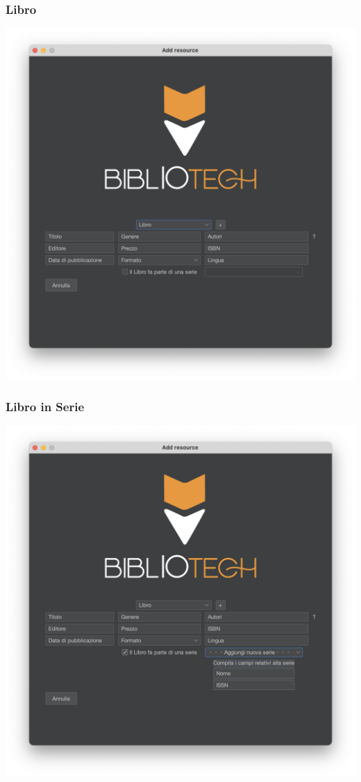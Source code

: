 \subsubsection{Libro}
\includegraphics[scale=0.25]{Immagini/Schermate/Insert/InserisciRisorsaPage-Libro.png}
\subsubsection{Libro in Serie}
\includegraphics[scale=0.25]{Immagini/Schermate/Insert/InserisciRisorsaPage-LibroSerie.png}


